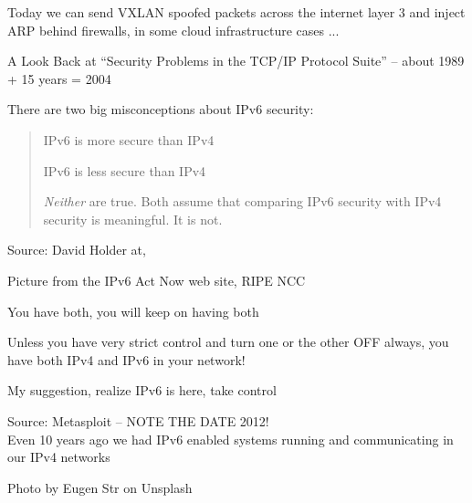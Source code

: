 \documentclass[Screen16to9,17pt]{foils}
\begin{document}
Today we can send VXLAN spoofed packets across the internet layer 3 and inject ARP behind firewalls, in some cloud infrastructure cases ...

A Look Back at “Security Problems in the TCP/IP Protocol Suite” -- about 1989 + 15 years = 2004




There are two big misconceptions about IPv6 security:

\begin{quote}
\begin{list2}
\item IPv6 is more secure than IPv4
\item IPv6 is less secure than IPv4
\end{list2}

\emph{Neither} are true. Both assume that comparing IPv6 security with IPv4 security is meaningful. It is not.
\end{quote}
Source: David Holder at, 



Picture from the IPv6 Act Now web site, RIPE NCC

\begin{list2}
\item You have both, you will keep on having both
\item Unless you have very strict control and turn one or the other OFF always, you have both IPv4 and IPv6 in your network!
\item My suggestion, realize IPv6 is here, take control
\end{list2}



Source: Metasploit -- NOTE THE DATE 2012!\\
Even 10 years ago we had IPv6 enabled systems running and communicating in our IPv4 networks








\hfill Photo by Eugen Str on Unsplash
\end{document}
